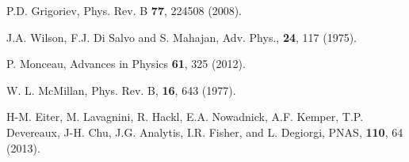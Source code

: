 \begin{thebibliography}{99}
 P.D. Grigoriev, Phys. Rev. B \textbf{77}, 224508 (2008).

J.A. Wilson, F.J. Di Salvo and S. Mahajan, Adv. Phys., \textbf{24},
117 (1975).

 P. Monceau, Advances in Physics \textbf{61}, 325 (2012).

W. L. McMillan, Phys. Rev. B, \textbf{16}, 643 (1977).

H-M. Eiter, M. Lavagnini, R. Hackl, E.A. Nowadnick, A.F. Kemper,
T.P. Devereaux, J-H. Chu, J.G. Analytis, I.R. Fisher, and L.
Degiorgi, PNAS, \textbf{110}, 64 (2013).

\end{thebibliography}

